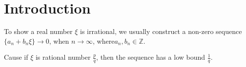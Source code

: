 %
%

\chapter{Introduction}

To show a real number $\xi$ is irrational, we usually construct a non-zero sequence
$\{a_n + b_n\xi\} \rightarrow 0$, when $n \rightarrow \infty$, where$a_n, b_n \in \mathbb{Z}$.

Cause if $\xi$ is rational number $\frac{p}{q}$, then the sequence has a low bound $\frac{1}{q}$.
